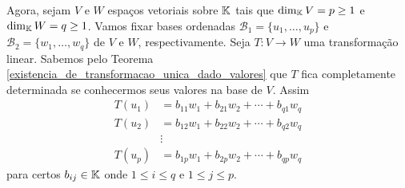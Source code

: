 Agora, sejam $V$ e $W$ espa\c{c}os vetoriais sobre $\mathbb{K}$ tais que $\dim_{\mathbb{K}}V = p \ge 1$ e $\dim_{\mathbb{K}} W = q \ge 1$. Vamos fixar bases ordenadas $\mathcal{B}_1 = \{u_1,\dots,u_p\}$ e $\mathcal{B}_2 = \{w_1,\dots,w_q\}$ de $V$ e $W$, respectivamente. Seja $T : V \to W$ uma transforma\c{c}\~ao linear. Sabemos pelo Teorema \ref{existencia_de_transformacao_unica_dado_valores} que $T$ fica completamente determinada se conhecermos seus valores na base de $V$. Assim
\begin{align*}
	T(u_1) &= b_{11}w_1 + b_{21}w_2 + \cdots + b_{q1}w_q\\
	T(u_2) &= b_{12}w_1 + b_{22}w_2 + \cdots + b_{q2}w_q\\
	&\vdots\\
	T(u_p) &= b_{1p}w_1 + b_{2p}w_2 + \cdots + b_{qp}w_q
\end{align*}
para certos $b_{ij} \in \mathbb{K}$ onde $1 \le i \le q$ e $1 \le j \le p$.

